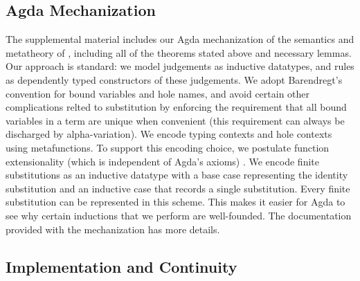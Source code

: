 
\vspace{-3px}
\subsection{Agda Mechanization}
\label{sec:agda-mechanization}
\vspace{-2px}

The supplemental material includes our Agda
mechanization  \cite{norell2009dependently,norell:thesis,Aydemir:2005fk}
of the semantics and metatheory of \HazelnutLive,
including all of the theorems stated above and necessary lemmas.
%
%
%
%
%
Our approach is standard: we model judgements as
inductive datatypes, and rules as dependently typed constructors of these judgements.
%
We adopt Barendregt's convention for bound variables \cite{urban,barendregt84:_lambda_calculus} and hole names, and avoid certain other complications relted to substitution by enforcing the requirement that all bound variables in a term are unique when convenient (this requirement can always be discharged by alpha-variation). We encode typing
contexts and hole contexts using metafunctions.
To support this encoding choice, we postulate function extensionality (which is independent of Agda's axioms) \cite{awodey2012inductive}. We encode finite substitutions as an inductive datatype with a base case representing the identity substitution and an inductive case that records a single substitution. Every finite substitution can be represented in this scheme. This makes it easier for Agda to see why certain inductions that we perform are well-founded.  
The documentation provided with the mechanization has more details.

\vspace{-3px}
\subsection{Implementation and Continuity}\label{sec:implementation}
\vspace{-2px}

